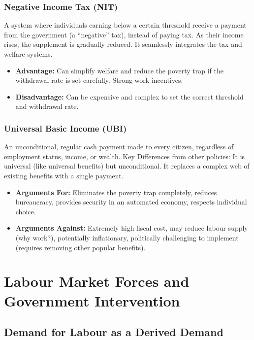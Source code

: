 \documentclass[11pt, a4paper, twoside]{book}
\begin{document}
\subsubsection{Negative Income Tax (NIT)}

A system where individuals earning below a certain threshold receive a payment from the government (a ``negative'' tax), instead of paying tax. As their income rises, the supplement is gradually reduced. It seamlessly integrates the tax and welfare systems.

\begin{itemize}
  \item \textbf{Advantage:} Can simplify welfare and reduce the poverty trap if the withdrawal rate is set carefully. Strong work incentives.
  \item \textbf{Disadvantage:} Can be expensive and complex to set the correct threshold and withdrawal rate.
\end{itemize}

\subsubsection{Universal Basic Income (UBI)}

An unconditional, regular cash payment made to every citizen, regardless of employment status, income, or wealth. Key Differences from other policies: It is universal (like universal benefits) but unconditional. It replaces a complex web of existing benefits with a single payment.

\begin{itemize}
  \item \textbf{Arguments For:} Eliminates the poverty trap completely, reduces bureaucracy, provides security in an automated economy, respects individual choice.
  \item \textbf{Arguments Against:} Extremely high fiscal cost, may reduce labour supply (why work?), potentially inflationary, politically challenging to implement (requires removing other popular benefits).
\end{itemize}

\section{Labour Market Forces and Government Intervention}

\subsection{Demand for Labour as a Derived Demand}
\end{document}
